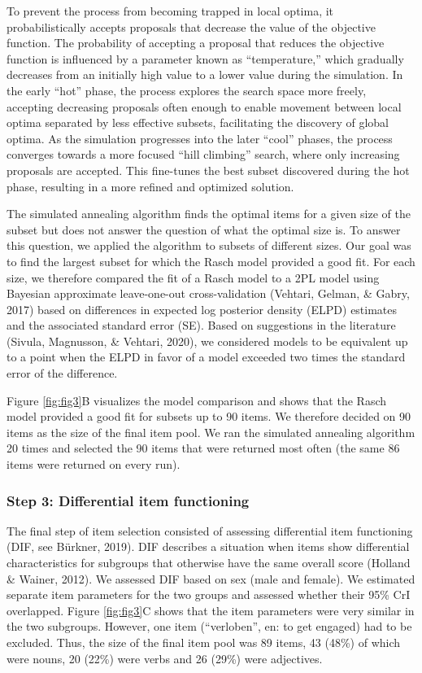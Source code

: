 \documentclass[
  man,floatsintext]{apa6}
\begin{document}
To prevent the process from becoming trapped in local optima, it probabilistically accepts proposals that decrease the value of the objective function. The probability of accepting a proposal that reduces the objective function is influenced by a parameter known as ``temperature,'' which gradually decreases from an initially high value to a lower value during the simulation. In the early ``hot'' phase, the process explores the search space more freely, accepting decreasing proposals often enough to enable movement between local optima separated by less effective subsets, facilitating the discovery of global optima. As the simulation progresses into the later ``cool'' phases, the process converges towards a more focused ``hill climbing'' search, where only increasing proposals are accepted. This fine-tunes the best subset discovered during the hot phase, resulting in a more refined and optimized solution.

The simulated annealing algorithm finds the optimal items for a given size of the subset but does not answer the question of what the optimal size is. To answer this question, we applied the algorithm to subsets of different sizes. Our goal was to find the largest subset for which the Rasch model provided a good fit. For each size, we therefore compared the fit of a Rasch model to a 2PL model using Bayesian approximate leave-one-out cross-validation (Vehtari, Gelman, \& Gabry, 2017) based on differences in expected log posterior density (ELPD) estimates and the associated standard error (SE). Based on suggestions in the literature (Sivula, Magnusson, \& Vehtari, 2020), we considered models to be equivalent up to a point when the ELPD in favor of a model exceeded two times the standard error of the difference.

Figure \ref{fig:fig3}B visualizes the model comparison and shows that the Rasch model provided a good fit for subsets up to 90 items. We therefore decided on 90 items as the size of the final item pool. We ran the simulated annealing algorithm 20 times and selected the 90 items that were returned most often (the same 86 items were returned on every run).

\hypertarget{step-3-differential-item-functioning}{%
\subsubsection{Step 3: Differential item functioning}\label{step-3-differential-item-functioning}}

The final step of item selection consisted of assessing differential item functioning (DIF, see Bürkner, 2019). DIF describes a situation when items show differential characteristics for subgroups that otherwise have the same overall score (Holland \& Wainer, 2012). We assessed DIF based on sex (male and female). We estimated separate item parameters for the two groups and assessed whether their 95\% CrI overlapped. Figure \ref{fig:fig3}C shows that the item parameters were very similar in the two subgroups. However, one item (``verloben'', en: to get engaged) had to be excluded. Thus, the size of the final item pool was 89 items, 43 (48\%) of which were nouns, 20 (22\%) were verbs and 26 (29\%) were adjectives.
\end{document}
